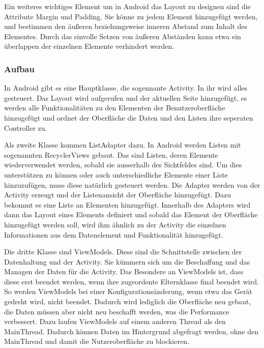 Ein weiteres wichtiges Element um in Android das Layout zu designen sind die Attribute Margin und Padding. Sie könne zu jedem Element hinzugefügt werden, und bestimmen den äußeren beziehungsweise inneren Abstand zum Inhalt des Elementes. Durch das sinvolle Setzen von äußeren Abständen kann etwa ein überlappen der einzelnen Elemente verhindert werden.

\subsubsection{Aufbau}
In Android gibt es eine Hauptklasse, die sogennante Activity. In ihr wird alles gesteuert. Das Layout wird aufgerufen und der aktuellen Seite hinzugefügt, es werden alle Funktionalitäten zu den Elementen der Benutzeroberfläche hinzugefügt und ordnet der Oberfläche die Daten und den Listen ihre seperaten Controller zu.

Als zweite Klasse kommen ListAdapter dazu. In Android werden Listen mit sogenannten RecyclerViews gebaut. Das sind Listen, deren Elemente wiederverwendet werden, sobald sie ausserhalb des Sichtfeldes sind. Um dies unterstützen zu können oder auch unterschiedliche Elemente einer Liste hinzuzufügen, muss diese natürlich gesteuert werden. Die Adapter werden von der Activity erzeugt und der Listenansicht der Oberfläche hinzugefügt. Dazu bekommt es eine Liste an Elementen hinzugefügt.
Innerhalb des Adapters wird dann das Layout eines Elements definiert und sobald das Element der Oberfläche hinzugefügt werden soll, wird ihm ähnlich zu der Activity die einzelnen Informationen aus dem Datenelement und Funktionalität hinzugefügt.

Die dritte Klasse sind ViewModels. Diese sind die Schnittstelle zwischen der Datenhaltung und der Activity. Sie kümmern sich um die Beschaffung und das Managen der Daten für die Activity. Das Besondere an ViewModels ist, dass diese erst beendet werden, wenn ihre zugeordente Elternklasse final beendet wird. So werden ViewModels bei einer Konfigurationsänderung, wenn etwa das Gerät gedreht wird, nicht beendet. Dadurch wird lediglich die Oberfläche neu gebaut, die Daten müssen aber nicht neu beschafft werden, was die Performance verbessert. Dazu laufen ViewModels auf einem anderen Thread als den MainThread. Dadurch können Daten im Hintergrund abgefragt werden, ohne den MainThread und damit die Nutzeroberfläche zu blockieren.


